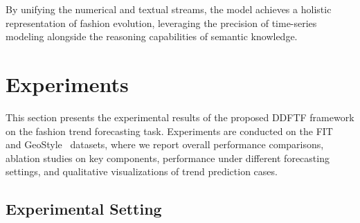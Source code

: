 \documentclass[Afour,sageh,times]{sagej}
\newcommand{\cui}[1]{\textcolor{blue}{[revise] #1}}
\begin{document}
{By unifying the numerical and textual streams, the model achieves a holistic representation of fashion evolution, leveraging the precision of time-series modeling alongside the reasoning capabilities of semantic knowledge.

\section{Experiments}
This section presents the experimental results of the proposed DDFTF framework on the fashion trend forecasting task. Experiments are conducted on the FIT~\cite{ma2020knowledge} and GeoStyle~\cite{mall2019geostyle} datasets, where we report overall performance comparisons, ablation studies on key components, performance under different forecasting settings, and qualitative visualizations of trend prediction cases.

\subsection{Experimental Setting} 


}
\end{document}
